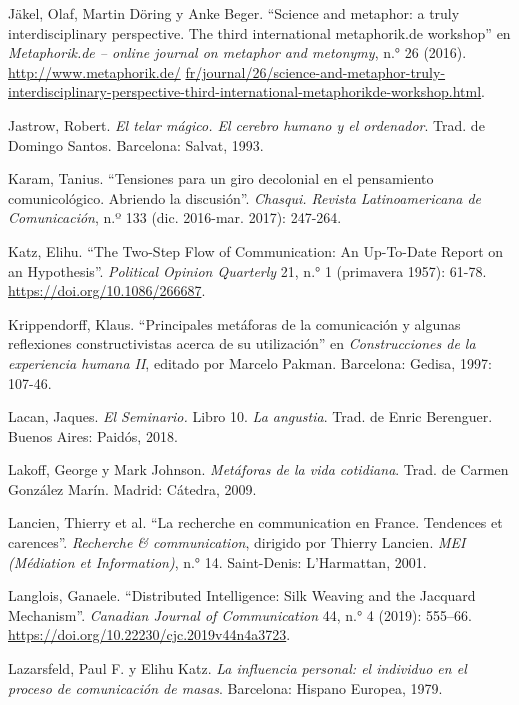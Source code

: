 \documentclass{tufte-handout}
\begin{document}
\begin{hangparas}{.25in}{1}
Jäkel, Olaf, Martin Döring y Anke Beger. ``Science and metaphor: a truly
interdisciplinary perspective. The third international metaphorik.de
workshop'' en \emph{Metaphorik.de -- online journal on metaphor and
metonymy}, n.° 26 (2016).
\href{http://www.metaphorik.de/fr/journal/26/science-and-metaphor-truly-interdisciplinary-perspective-third-international-metaphorikde-workshop.html}{http://www.metaphorik.de/} \href{http://www.metaphorik.de/fr/journal/26/science-and-metaphor-truly-interdisciplinary-perspective-third-international-metaphorikde-workshop.html}{fr/journal/26/science-and-metaphor-truly-interdisciplinary-perspective-third-international-metaphorikde-workshop.html}.

Jastrow, Robert. \emph{El telar mágico. El cerebro humano y el
ordenador}. Trad. de Domingo Santos. Barcelona: Salvat, 1993.

Karam, Tanius. ``Tensiones para un giro decolonial en el pensamiento
comunicológico. Abriendo la discusión''. \emph{Chasqui. Revista
Latinoamericana de Comunicación}, n.º 133 (dic. 2016-mar. 2017):
247-264.

Katz, Elihu. ``The Two-Step Flow of Communication: An Up-To-Date Report
on an Hypothesis''. \emph{Political Opinion Quarterly} 21, n.° 1
(primavera 1957): 61-78. \url{https://doi.org/10.1086/266687}.

Krippendorff, Klaus. ``Principales metáforas de la comunicación y
algunas reflexiones constructivistas acerca de su utilización'' en
\emph{Construcciones de la experiencia humana II}, editado por Marcelo
Pakman. Barcelona: Gedisa, 1997: 107-46.

Lacan, Jaques. \emph{El Seminario.} Libro 10. \emph{La angustia}. Trad.
de Enric Berenguer. Buenos Aires: Paidós, 2018.

Lakoff, George y Mark Johnson. \emph{Metáforas de la vida cotidiana}.
Trad. de Carmen González Marín. Madrid: Cátedra, 2009.

Lancien, Thierry et al. ``La recherche en communication en France.
Tendences et carences''. \emph{Recherche \& communication}, dirigido por
Thierry Lancien. \emph{MEI} \emph{(Médiation et Information)}, n.° 14.
Saint-Denis: L'Harmattan, 2001.

Langlois, Ganaele. ``Distributed Intelligence: Silk Weaving and the
Jacquard Mechanism''. \emph{Canadian Journal of Communication} 44, n.° 4
(2019): 555--66. \url{https://doi.org/10.22230/cjc.2019v44n4a3723}.

Lazarsfeld, Paul F. y Elihu Katz. \emph{La influencia personal: el
individuo en el proceso de comunicación de masas}. Barcelona: Hispano
Europea, 1979.


\end{hangparas}
\end{document}

